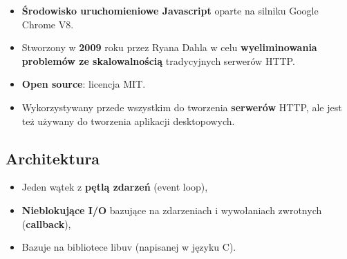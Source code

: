 \documentclass[../main.tex]{subfiles}
\begin{document}
    \begin{itemize}
        \item \textbf{Środowisko uruchomieniowe Javascript} oparte na silniku Google Chrome V8.
        \item Stworzony w \textbf{2009} roku przez Ryana Dahla w celu \textbf{wyeliminowania problemów ze skalowalnością} tradycyjnych serwerów HTTP.
        \item \textbf{Open source}: licencja MIT.
        \item Wykorzystywany przede wszystkim do tworzenia \textbf{serwerów} HTTP, ale jest też używany do tworzenia aplikacji desktopowych.
    \end{itemize}

    \subsection{Architektura}
    \begin{itemize}
        \item Jeden wątek z \textbf{pętlą zdarzeń} (event loop),
        \item \textbf{Nieblokujące I/O} bazujące na zdarzeniach i wywołaniach zwrotnych (\textbf{callback}),
        \item Bazuje na bibliotece libuv (napisanej w języku C).
    \end{itemize}
\end{document}
